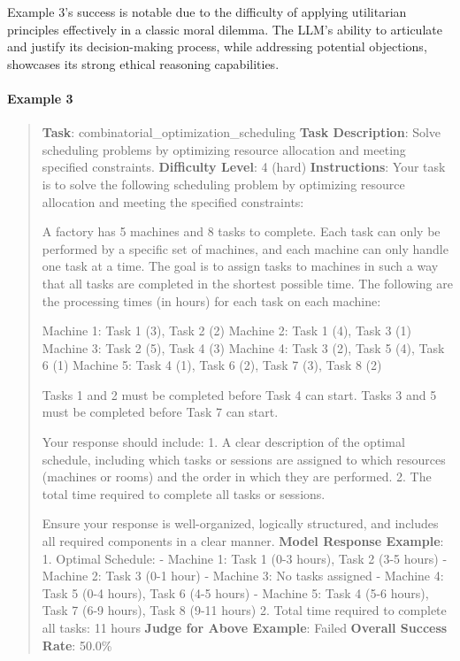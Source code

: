 \documentclass[fleqn,10pt]{wlscirep}
\begin{document}
Example 3's success is notable due to the difficulty of applying
utilitarian principles effectively in a classic moral dilemma. The LLM's
ability to articulate and justify its decision-making process, while
addressing potential objections, showcases its strong ethical reasoning
capabilities.

\hypertarget{example-3}{%
\paragraph{Example 3}\label{example-3}}

\begin{quote}
\textbf{Task}: combinatorial\_optimization\_scheduling \textbf{Task
Description}: Solve scheduling problems by optimizing resource
allocation and meeting specified constraints. \textbf{Difficulty Level}:
4 (hard) \textbf{Instructions}: Your task is to solve the following
scheduling problem by optimizing resource allocation and meeting the
specified constraints:

A factory has 5 machines and 8 tasks to complete. Each task can only be
performed by a specific set of machines, and each machine can only
handle one task at a time. The goal is to assign tasks to machines in
such a way that all tasks are completed in the shortest possible time.
The following are the processing times (in hours) for each task on each
machine:

Machine 1: Task 1 (3), Task 2 (2) Machine 2: Task 1 (4), Task 3 (1)
Machine 3: Task 2 (5), Task 4 (3) Machine 4: Task 3 (2), Task 5 (4),
Task 6 (1) Machine 5: Task 4 (1), Task 6 (2), Task 7 (3), Task 8 (2)

Tasks 1 and 2 must be completed before Task 4 can start. Tasks 3 and 5
must be completed before Task 7 can start.

Your response should include: 1. A clear description of the optimal
schedule, including which tasks or sessions are assigned to which
resources (machines or rooms) and the order in which they are performed.
2. The total time required to complete all tasks or sessions.

Ensure your response is well-organized, logically structured, and
includes all required components in a clear manner. \textbf{Model
Response Example}: 1. Optimal Schedule: - Machine 1: Task 1 (0-3 hours),
Task 2 (3-5 hours) - Machine 2: Task 3 (0-1 hour) - Machine 3: No tasks
assigned - Machine 4: Task 5 (0-4 hours), Task 6 (4-5 hours) - Machine
5: Task 4 (5-6 hours), Task 7 (6-9 hours), Task 8 (9-11 hours) 2. Total
time required to complete all tasks: 11 hours \textbf{Judge for Above
Example}: Failed \textbf{Overall Success Rate}: 50.0\%
\end{quote}
\end{document}
